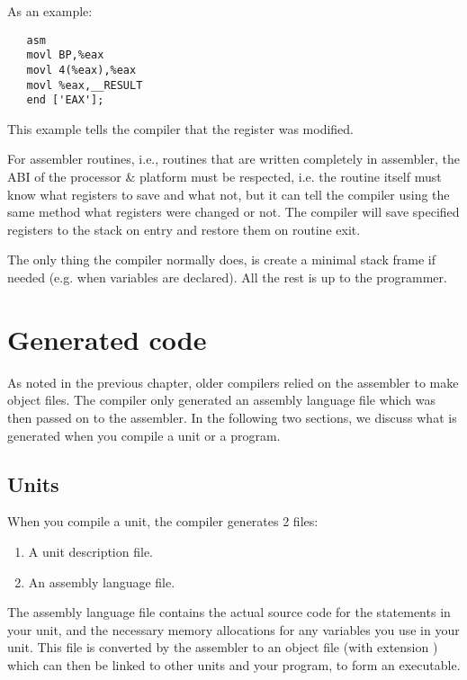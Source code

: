 As an example:
\begin{verbatim}
   asm
   movl BP,%eax
   movl 4(%eax),%eax
   movl %eax,__RESULT
   end ['EAX'];
\end{verbatim}
This example tells the compiler that the  register was modified.

For assembler routines, i.e., routines that are written completely in
assembler, the ABI of the processor \& platform must be respected, i.e. 
the routine itself must know what registers to save and what not, but it
can tell the compiler using the same method what registers were changed
or not. The compiler will save specified registers to the stack on
entry and restore them on routine exit.

The only thing the compiler normally does, is create a minimal stack frame 
if needed (e.g. when variables are declared). All the rest is up to the 
programmer.


\chapter{Generated code}
\label{ch:GenCode}
As noted in the previous chapter, older \fpc compilers relied on the \gnu
assembler to make object files. The compiler only generated an assembly 
language file which was then passed on to the assembler. In the following 
two sections, we discuss what is generated when you compile a unit or a 
program.

\section{Units}
\label{se:Units}
When you compile a unit, the \fpc compiler generates 2 files:
\begin{enumerate}
\item A unit description file.
\item An assembly language file.
\end{enumerate}
The assembly language file contains the actual source code for the
statements in your unit, and the necessary memory allocations for any
variables you use in your unit. This file is converted by the assembler to
an object file (with extension ) which can then be linked to other
units and your program, to form an executable.

